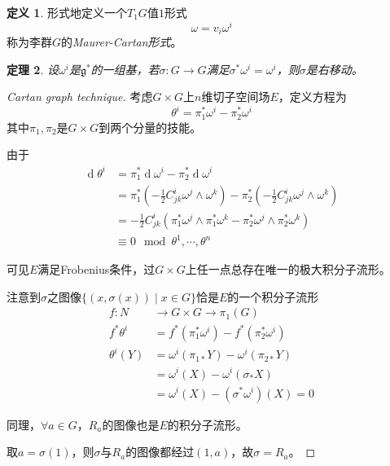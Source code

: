 \documentclass[winfonts,UTF8,c5size,a4paper,fancyhdr,hyperref,titlepage,nocap]{ctexart}
\newtheorem{thm}{定理}
\theoremstyle{definition}
\newtheorem{defn}[thm]{定义}
\theoremstyle{remark}
\numberwithin{equation}{subsection}
\newcommand{\g}{\mathfrak{g}}
\newcommand{\red}{\color{red}}
\newcommand{\dd}{\operatorname{d}}
\begin{document}
\begin{defn}
  形式地定义一个$T_1G$值$1$形式
  \begin{equation*}
    \omega=v_i\omega^i
  \end{equation*}
  称为李群$G$的\emph{\red Maurer-Cartan形式}。
\end{defn}

\begin{thm}
  设$\omega^i$是$\g^{\ast}$的一组基，若$\sigma\colon G\to G$满足$\sigma^{\ast}\omega^i=\omega^i$，则$\sigma$是右移动。
\end{thm}
\begin{proof}[Cartan graph technique]
考虑$G\times G$上$n$维切子空间场$E$，定义方程为
\begin{equation*}
\theta^i=\pi_1^{\ast}\omega^i-\pi_2^{\ast}\omega^i
\end{equation*}
其中$\pi_1,\pi_2$是$G\times G$到两个分量的技能。

由于
\begin{align*}
\dd\theta^i&=\pi_1^{\ast}\dd\omega^i-\pi_2^{\ast}\dd\omega^i\\
           &=\pi_1^{\ast}(-\frac{1}{2}C^i_{jk}\omega^j\wedge\omega^k)-\pi_2^{\ast}(-\frac{1}{2}C^i_{jk}\omega^j\wedge\omega^k)\\
           &=-\frac{1}{2}C^i_{jk}(\pi_1^{\ast}\omega^j\wedge\pi_1^{\ast}\omega^k-\pi_2^{\ast}\omega^j\wedge\pi_2^{\ast}\omega^k)\\
           &\equiv0\mod\theta^1,\cdots,\theta^n
\end{align*}

可见$E$满足Frobenius条件，过$G\times G$上任一点总存在唯一的极大积分子流形。

注意到$\sigma$之图像$\{(x,\sigma(x))\mid x\in G\}$恰是$E$的一个积分子流形
\begin{align*}
f\colon N&\to G\times G\to \pi_1(G)\\
f^{\ast}\theta^i&=f^{\ast}(\pi_1^{\ast}\omega^i)-f^{\ast}(\pi_2^{\ast}\omega^i)\\
\theta^i(Y)&=\omega^i(\pi_{1\ast}Y)-\omega^i(\pi_{2\ast}Y)\\
           &=\omega^i(X)-\omega^i(\sigma_{\ast}X)\\
           &=\omega^i(X)-(\sigma^{\ast}\omega^i)(X)=0
\end{align*}

同理，$\forall a\in G$，$R_a$的图像也是$E$的积分子流形。

取$a=\sigma(1)$，则$\sigma$与$R_a$的图像都经过$(1,a)$，故$\sigma=R_a$。
\end{proof}
\end{document}
